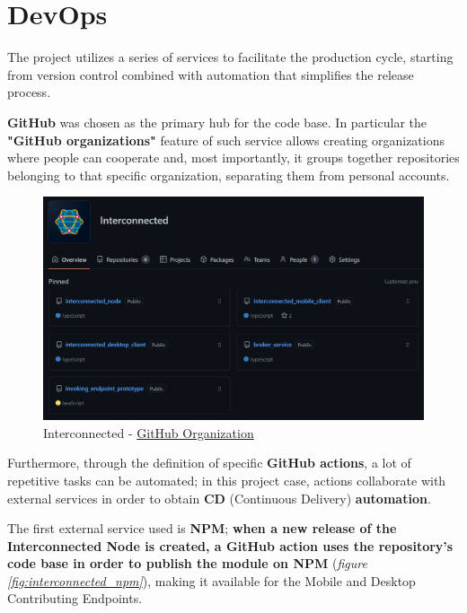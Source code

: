 \section{DevOps}\label{devops}
The project utilizes a series of services to facilitate the production cycle, starting from version control combined with automation that simplifies the release process.

\textbf{GitHub} was chosen as the primary hub for the code base. In particular the \textbf{"GitHub organizations"} feature of such service allows creating organizations where people can cooperate and, most importantly, it groups together repositories belonging to that specific organization, separating them from personal accounts.

\begin{figure}[!ht]
    \centering
    \includegraphics[width=\linewidth]{document/chapters/chapter_6/images/interconnected_organization.png}
    \caption{Interconnected - \href{https://github.com/Interconnected-project}{GitHub Organization}}
    \label{fig:interconnected_organization}
\end{figure}

Furthermore, through the definition of specific \textbf{GitHub actions}, a lot of repetitive tasks can be automated; in this project case, actions collaborate with external services in order to obtain \textbf{CD} (Continuous Delivery) \textbf{automation}.

The first external service used is \textbf{NPM}; \textbf{when a new release of the Interconnected Node is created, a GitHub action uses the repository's code base in order to publish the module on NPM} (\textit{figure \ref{fig:interconnected_npm}}), making it available for the Mobile and Desktop Contributing Endpoints.

